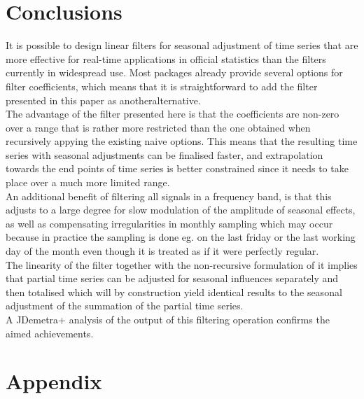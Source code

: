 \documentclass[english,blauw]{cbsdiscussionpaper}
\begin{document}
\section{Conclusions}
It is possible to design linear filters for seasonal adjustment of time series that are more effective for real-time applications in official statistics than the filters currently in widespread use. Most packages already provide several options for filter coefficients, which means that it is straightforward to add the filter presented in this paper as anotheralternative.\\The advantage of the filter presented here is that the coefficients are non-zero over a range that is rather more restricted than the one obtained when recursively appying the existing naive options. This means that the resulting time series with seasonal adjustments can be finalised faster, and extrapolation towards the end points of time series is better constrained since it needs to take place over a much more limited range.\\An additional benefit of filtering all signals in a frequency band, is that this adjusts to a large degree for slow modulation of the amplitude of seasonal effects, as well as compensating irregularities in monthly sampling which may occur because in practice the sampling is done eg. on the last friday or the last working day of the month even though it is treated as if it were perfectly regular.\\The linearity of the filter together with the non-recursive formulation of it implies that partial time series can be adjusted for seasonal influences separately and then totalised which will by construction yield identical results to the seasonal adjustment of the summation of the partial time series.\\A JDemetra+ analysis of the output of this filtering operation confirms the aimed achievements.
 \newpage
 \section*{Appendix}
\end{document}
